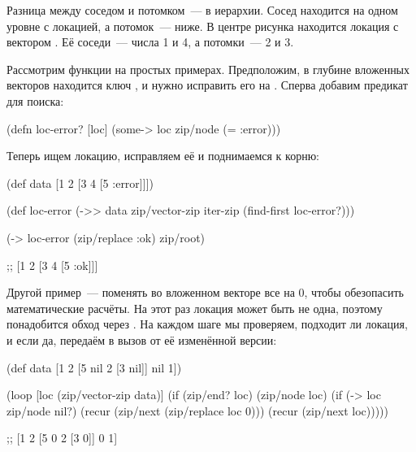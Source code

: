 
Разница между соседом и потомком~--- в иерархии. Сосед находится на одном уровне с
локацией, а потомок~--- ниже. В центре рисунка находится локация с вектором \code{[2 3]}.
Её соседи~--- числа 1 и 4, а потомки~--- 2 и 3.

\begin{figure}[H]
  \centering
  
  \label{fig:chart-zip-12}
\end{figure}

Рассмотрим функции на простых примерах. Предположим, в глубине вложенных
векторов находится ключ , и нужно исправить его на . Сперва добавим
предикат для поиска:

\begin{english}
  \begin{clojure}
(defn loc-error? [loc]
  (some-> loc zip/node (= :error)))
  \end{clojure}
\end{english}

Теперь ищем локацию, исправляем её и поднимаемся к корню:

\begin{english}
  \begin{clojure}
(def data [1 2 [3 4 [5 :error]]])

(def loc-error
  (->> data
       zip/vector-zip
       iter-zip
       (find-first loc-error?)))

(-> loc-error
    (zip/replace :ok)
    zip/root)

;; [1 2 [3 4 [5 :ok]]]
  \end{clojure}
\end{english}


Другой пример~--- поменять во вложенном векторе все  на 0, чтобы
обезопасить математические расчёты. На этот раз локация может быть не одна,
поэтому понадобится обход через . На каждом шаге мы проверяем,
подходит ли локация, и если да, передаём в  вызов  от
её изменённой версии:

\begin{english}
  \begin{clojure}
(def data
  [1 2 [5 nil 2 [3 nil]] nil 1])

(loop [loc (zip/vector-zip data)]
  (if (zip/end? loc)
    (zip/node loc)
    (if (-> loc zip/node nil?)
      (recur (zip/next (zip/replace loc 0)))
      (recur (zip/next loc)))))

;; [1 2 [5 0 2 [3 0]] 0 1]
  \end{clojure}
\end{english}

